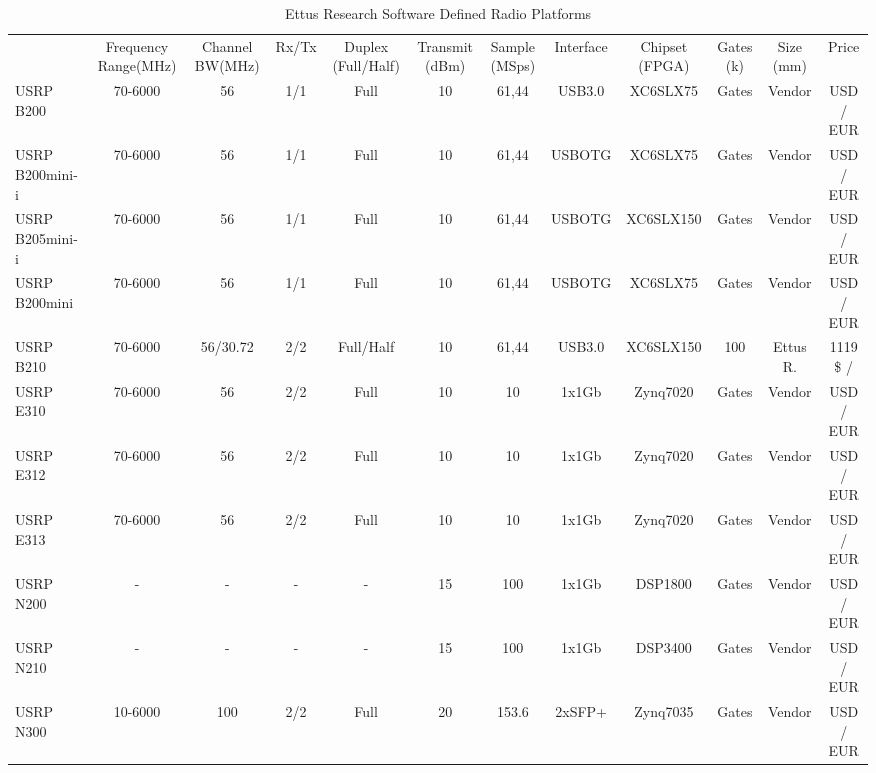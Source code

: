 \begin{sidewaystable*}
\scriptsize
 \caption{Ettus Research Software Defined Radio Platforms}

\label{my-label}
\begin{tabularx}{\textwidth}{@{}l*{10}{C}c@{}}
\addlinespace
\addlinespace
\toprule
     & Frequency Range(MHz) & Channel BW(MHz) & Rx/Tx & Duplex (Full/Half) & Transmit  (dBm) & Sample  (MSps) & Interface & Chipset (FPGA) &  Gates (k) & Size (mm)  & Price  \\ 
     \addlinespace
\midrule
\addlinespace 
USRP B200 & 70-6000 & 56 & 1/1 & Full & 10 & 61,44 & USB3.0 & XC6SLX75 & Gates & Vendor & USD / EUR  \\

USRP B200mini-i & 70-6000 & 56 & 1/1 & Full & 10 & 61,44 & USBOTG & XC6SLX75 & Gates & Vendor & USD / EUR  \\ 

USRP B205mini-i & 70-6000 & 56 & 1/1 & Full & 10 & 61,44 & USBOTG & XC6SLX150 & Gates & Vendor & USD / EUR  \\ 

USRP B200mini & 70-6000 & 56 & 1/1 & Full & 10 & 61,44 & USBOTG & XC6SLX75 & Gates & Vendor & USD / EUR  \\  

USRP B210   & 70-6000 & 56/30.72 & 2/2 & Full/Half & 10 & 61,44 & USB3.0 & XC6SLX150 & 100 & Ettus R.    & 1119 \$ /  \\ 

\addlinespace

USRP E310 & 70-6000 & 56 & 2/2 & Full & 10 & 10 & 1x1Gb & Zynq7020 & Gates & Vendor & USD / EUR  \\ 

USRP E312 & 70-6000 & 56 & 2/2 & Full & 10 & 10 & 1x1Gb & Zynq7020 & Gates & Vendor & USD / EUR  \\ 

USRP E313 & 70-6000 & 56 & 2/2 & Full & 10 & 10 & 1x1Gb & Zynq7020 & Gates & Vendor & USD / EUR  \\ 

\addlinespace 

USRP N200 & - & - & - & - & 15 & 100 & 1x1Gb & DSP1800 & Gates & Vendor & USD / EUR  \\  

USRP N210 & - & - & - & - & 15 & 100 & 1x1Gb & DSP3400 & Gates & Vendor & USD / EUR  \\  

USRP N300 & 10-6000 & 100 & 2/2 & Full & 20 & 153.6 & 2xSFP+ & Zynq7035 & Gates & Vendor & USD / EUR  \\ 


\end{tabularx}
\end{sidewaystable*}
